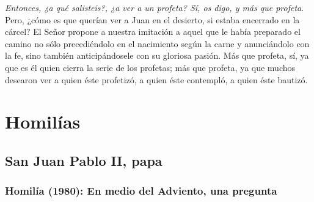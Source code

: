 \begin{body}
				\emph{Entonces, ¿a qué salisteis?, ¿a ver a un profeta? Sí, os digo, y más que profeta}. Pero, ¿cómo es que querían ver a Juan en el desierto, si estaba encerrado en la cárcel? El Señor propone a nuestra imitación a aquel que le había preparado el camino no sólo precediéndolo en el nacimiento según la carne y anunciándolo con la fe, sino también anticipándosele con su gloriosa pasión. Más que profeta, sí, ya que es él quien cierra la serie de los profetas; más que profeta, ya que muchos desearon ver a quien éste profetizó, a quien éste contempló, a quien éste bautizó.
			\end{body}
		
	\newsection 
	
	\section{Homilías}
	
		\subsection{San Juan Pablo II, papa}
		
			\subsubsection{Homilía (1980): En medio del Adviento, una pregunta}
			
			
